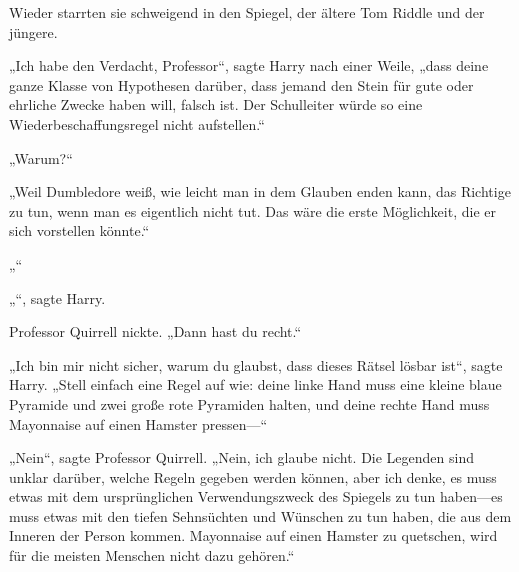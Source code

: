 Wieder starrten sie schweigend in den Spiegel, der ältere Tom Riddle und der jüngere.

„Ich habe den Verdacht, Professor“, sagte Harry nach einer Weile, „dass deine ganze Klasse von Hypothesen darüber, dass jemand den Stein für gute oder ehrliche Zwecke haben will, falsch ist. Der Schulleiter würde so eine Wiederbeschaffungsregel nicht aufstellen.“

„Warum?“

„Weil Dumbledore weiß, wie leicht man in dem Glauben enden kann, das Richtige zu tun, wenn man es eigentlich nicht tut. Das wäre die erste Möglichkeit, die er sich vorstellen könnte.“

„“

„“, sagte Harry.

Professor Quirrell nickte.
„Dann hast du recht.“

„Ich bin mir nicht sicher, warum du glaubst, dass dieses Rätsel lösbar ist“, sagte Harry. „Stell einfach eine Regel auf wie: deine linke Hand muss eine kleine blaue Pyramide und zwei große rote Pyramiden halten, und deine rechte Hand muss Mayonnaise auf einen Hamster pressen—“

„Nein“, sagte Professor Quirrell. „Nein, ich glaube nicht. Die Legenden sind unklar darüber, welche Regeln gegeben werden können, aber ich denke, es muss etwas mit dem ursprünglichen Verwendungszweck des Spiegels zu tun haben—es muss etwas mit den tiefen Sehnsüchten und Wünschen zu tun haben, die aus dem Inneren der Person kommen. Mayonnaise auf einen Hamster zu quetschen, wird für die meisten Menschen nicht dazu gehören.“


